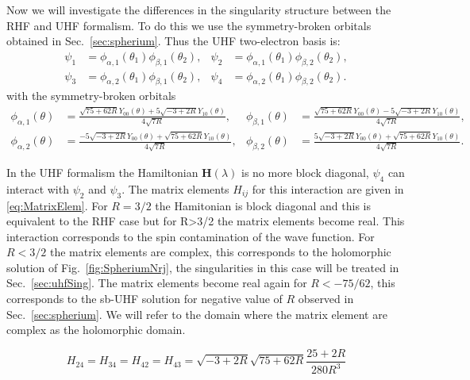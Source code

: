 \documentclass[11pt,a4paper]{article}
\newcommand{\bH}{\mathbf{H}}
\begin{document}
Now we will investigate the differences in the singularity structure between the RHF and UHF formalism. To do this we use the symmetry-broken orbitals obtained in Sec.~\ref{sec:spherium}. Thus the UHF two-electron basis is:
\begin{align}\label{eq:uhfbasis}
 \psi_1 & =\phi_{\alpha,1}(\theta_1)\phi_{\beta,1}(\theta_2),
 & 
 \psi_2 & =\phi_{\alpha,1}(\theta_1)\phi_{\beta,2}(\theta_2),\\
 \psi_3 & =\phi_{\alpha,2}(\theta_1)\phi_{\beta,1}(\theta_2),
 & 
 \psi_4 & =\phi_{\alpha,2}(\theta_1)\phi_{\beta,2}(\theta_2).
\end{align}
with the symmetry-broken orbitals
\begin{align*}\label{eq:uhforbitals}
 \phi_{\alpha,1}(\theta) & =\frac{\sqrt{75+62R}Y_{00}(\theta)+5\sqrt{-3+2R}Y_{10}(\theta)}{4\sqrt{7R}},
 & 
 \phi_{\beta,1}(\theta) & =\frac{\sqrt{75+62R}Y_{00}(\theta)-5\sqrt{-3+2R}Y_{10}(\theta)}{4\sqrt{7R}},\\
 \phi_{\alpha,2}(\theta) & =\frac{-5\sqrt{-3+2R}Y_{00}(\theta)+\sqrt{75+62R}Y_{10}(\theta)}{4\sqrt{7R}},
 & 
 \phi_{\beta,2}(\theta) & =\frac{5\sqrt{-3+2R}Y_{00}(\theta)+\sqrt{75+62R}Y_{10}(\theta)}{4\sqrt{7R}}.
\end{align*}

In the UHF formalism the Hamiltonian $\bH(\lambda)$ is no more block diagonal, $\psi_4$ can interact with $\psi_2$ and $\psi_3$. The matrix elements $H_{ij}$ for this interaction are given in \eqref{eq:MatrixElem}. For $R=3/2$ the Hamitonian is block diagonal and this is equivalent to the RHF case but for R>3/2 the matrix elements become real. This interaction corresponds to the spin contamination of the wave function. For $R<3/2$ the matrix elements are complex, this corresponds to the holomorphic solution of Fig.~\ref{fig:SpheriumNrj}, the singularities in this case will be treated in Sec.~\ref{sec:uhfSing}. The matrix elements become real again for $R<-75/62$, this corresponds to the sb-UHF solution for negative value of $R$ observed in Sec.~\ref{sec:spherium}. We will refer to the domain where the matrix element are complex as the holomorphic domain.

\begin{equation}\label{eq:MatrixElem}
H_{24}=H_{34}=H_{42}=H_{43}=\sqrt{-3+2R}\sqrt{75+62R}\frac{25+2R}{280R^3}
\end{equation}
\end{document}
